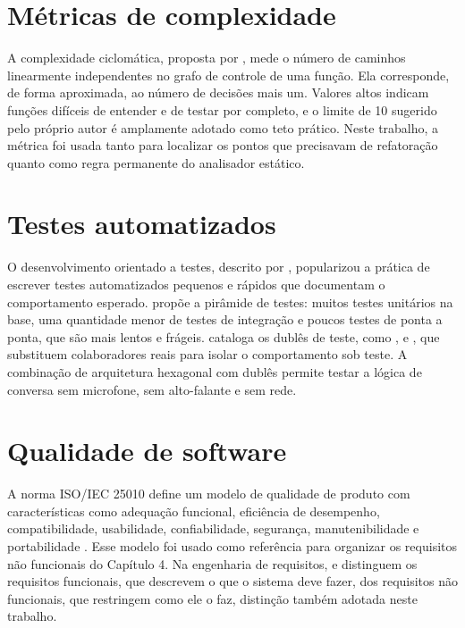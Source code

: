\section{Métricas de complexidade}

A complexidade ciclomática, proposta por \textcite{mccabe1976}, mede o número de caminhos linearmente
independentes no grafo de controle de uma função. Ela corresponde, de forma aproximada, ao número de
decisões mais um. Valores altos indicam funções difíceis de entender e de testar por completo, e o
limite de 10 sugerido pelo próprio autor é amplamente adotado como teto prático. Neste trabalho, a
métrica foi usada tanto para localizar os pontos que precisavam de refatoração quanto como regra
permanente do analisador estático.

\section{Testes automatizados}

O desenvolvimento orientado a testes, descrito por \textcite{beck2003}, popularizou a prática de
escrever testes automatizados pequenos e rápidos que documentam o comportamento esperado.
\textcite{cohn2009} propõe a pirâmide de testes: muitos testes unitários na base, uma quantidade menor
de testes de integração e poucos testes de ponta a ponta, que são mais lentos e frágeis.
\textcite{meszaros2007} cataloga os dublês de teste, como ,  e , que
substituem colaboradores reais para isolar o comportamento sob teste. A combinação de arquitetura
hexagonal com dublês permite testar a lógica de conversa sem microfone, sem alto-falante e sem rede.

\section{Qualidade de software}

A norma ISO/IEC 25010 define um modelo de qualidade de produto com características como adequação
funcional, eficiência de desempenho, compatibilidade, usabilidade, confiabilidade, segurança,
manutenibilidade e portabilidade \cite{iso25010}. Esse modelo foi usado como referência para organizar
os requisitos não funcionais do Capítulo 4. Na engenharia de requisitos, \textcite{sommerville2018} e
\textcite{pressman2016} distinguem os requisitos funcionais, que descrevem o que o sistema deve fazer,
dos requisitos não funcionais, que restringem como ele o faz, distinção também adotada neste
trabalho.


